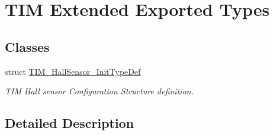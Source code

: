 \hypertarget{group___t_i_m_ex___exported___types}{}\section{T\+IM Extended Exported Types}
\label{group___t_i_m_ex___exported___types}
\subsection*{Classes}
\begin{DoxyCompactItemize}
\item 
struct \mbox{\hyperlink{struct_t_i_m___hall_sensor___init_type_def}{T\+I\+M\+\_\+\+Hall\+Sensor\+\_\+\+Init\+Type\+Def}}
\begin{DoxyCompactList}\small\item\em T\+IM Hall sensor Configuration Structure definition. \end{DoxyCompactList}\end{DoxyCompactItemize}


\subsection{Detailed Description}
